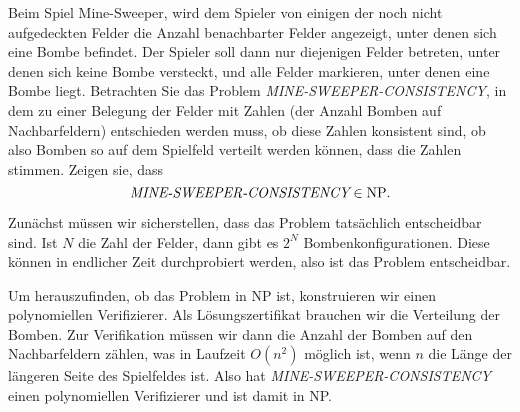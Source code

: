 Beim Spiel Mine-Sweeper, wird dem Spieler von einigen der noch nicht
aufgedeckten Felder die Anzahl benachbarter Felder angezeigt, unter
denen sich eine Bombe befindet. Der Spieler soll dann nur diejenigen
Felder betreten, unter denen sich keine Bombe versteckt, und alle
Felder markieren, unter denen eine Bombe liegt. Betrachten Sie das
Problem {\it MINE-SWEEPER-CONSISTENCY}, in dem zu einer Belegung der
Felder mit Zahlen (der Anzahl Bomben auf Nachbarfeldern) entschieden
werden muss, ob diese Zahlen konsistent sind, ob also Bomben so
auf dem Spielfeld verteilt werden können, dass die Zahlen stimmen.
Zeigen sie, dass
\[
\text{\it MINE-SWEEPER-CONSISTENCY}\in \text{NP}.
\]


\begin{loesung}
Zunächst müssen wir sicherstellen, dass das Problem tatsächlich
entscheidbar sind.
Ist $N$ die Zahl der Felder, dann gibt es $2^N$ Bombenkonfigurationen.
Diese können in endlicher Zeit durchprobiert werden, also ist das
Problem entscheidbar.

Um herauszufinden, ob das Problem in NP ist, konstruieren wir
einen polynomiellen Verifizierer.
Als Lösungszertifikat brauchen wir die Verteilung der Bomben.
Zur Verifikation müssen wir dann die Anzahl der Bomben auf den
Nachbarfeldern zählen, was in Laufzeit $O(n^2)$ möglich ist,
wenn $n$ die Länge der längeren Seite des Spielfeldes ist.
Also hat
{\it MINE-SWEEPER-CONSISTENCY} einen polynomiellen Verifizierer und
ist damit in NP.
\end{loesung}
